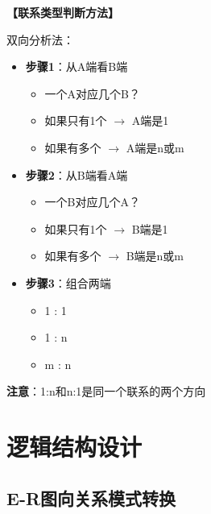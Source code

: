 \documentclass[12pt, a4paper]{article}
\newenvironment{bluebox}[1]{%
  \begin{trivlist}
  \item[\hskip\labelsep \textbf{#1}]
  \setlength{\parskip}{0.5ex}
  \setlength{\itemsep}{0.5ex}
}{%
  \end{trivlist}
  }
\begin{document}
\begin{bluebox}{联系类型判断}
	\textbf{【联系类型判断方法】}

	双向分析法：

	\begin{itemize}[leftmargin=*, nosep]
		\item \textbf{步骤1}：从A端看B端
		      \begin{itemize}[nosep]
			      \item 一个A对应几个B？
			      \item 如果只有1个 $\to$ A端是1
			      \item 如果有多个 $\to$ A端是n或m
		      \end{itemize}

		\item \textbf{步骤2}：从B端看A端
		      \begin{itemize}[nosep]
			      \item 一个B对应几个A？
			      \item 如果只有1个 $\to$ B端是1
			      \item 如果有多个 $\to$ B端是n或m
		      \end{itemize}

		\item \textbf{步骤3}：组合两端
		      \begin{itemize}[nosep]
			      \item 1 : 1
			      \item 1 : n
			      \item m : n
		      \end{itemize}
	\end{itemize}

	\textbf{注意}：1:n和n:1是同一个联系的两个方向
\end{bluebox}

\section{逻辑结构设计}

\subsection{E-R图向关系模式转换}
\end{document}
